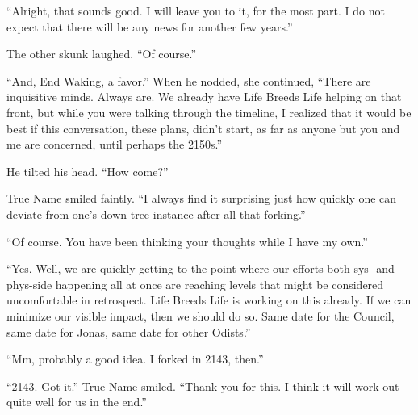 ``Alright, that sounds good. I will leave you to it, for the most part. I do not expect that there will be any news for another few years.''

The other skunk laughed. ``Of course.''

``And, End Waking, a favor.'' When he nodded, she continued, ``There are inquisitive minds. Always are. We already have Life Breeds Life helping on that front, but while you were talking through the timeline, I realized that it would be best if this conversation, these plans, didn't start, as far as anyone but you and me are concerned, until perhaps the 2150s.''

He tilted his head. ``How come?''

True Name smiled faintly. ``I always find it surprising just how quickly one can deviate from one's down-tree instance after all that forking.''

``Of course. You have been thinking your thoughts while I have my own.''

``Yes. Well, we are quickly getting to the point where our efforts both sys- and phys-side happening all at once are reaching levels that might be considered uncomfortable in retrospect. Life Breeds Life is working on this already. If we can minimize our visible impact, then we should do so. Same date for the Council, same date for Jonas, same date for other Odists.''

``Mm, probably a good idea. I forked in 2143, then.''

``2143. Got it.'' True Name smiled. ``Thank you for this. I think it will work out quite well for us in the end.''
